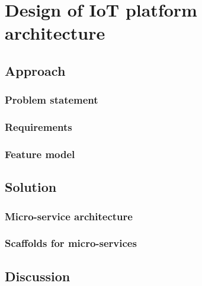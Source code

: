\chapter{Design of IoT platform architecture}
\section{Approach}
\subsection{Problem statement}
\subsection{Requirements}
\subsection{Feature model}
\section{Solution}
\subsection{Micro-service architecture}
\subsection{Scaffolds for micro-services}
\section{Discussion}




